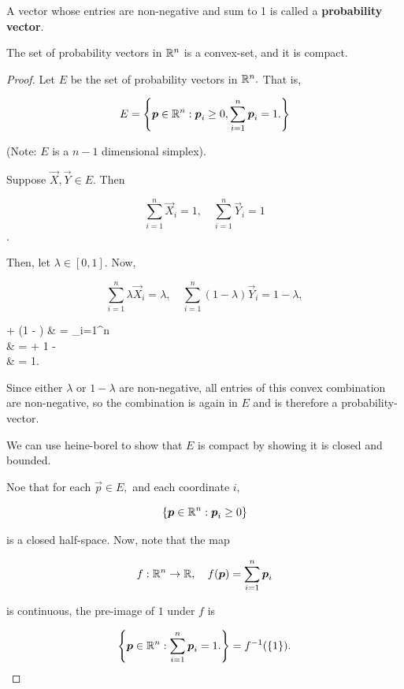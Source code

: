 \documentclass{article}
\begin{document}
\begin{definition}
	A \@{vector} whose \@{entries} are \@{non-negative} and sum to 1 is called a \textbf{probability vector}.
\end{definition}

\begin{theorem}\label{probability-vectors-form-a-convex-compact-set}
The set of \@{probability vectors} in $\mathbb{R}^n$ is a \@{convex-set}, and it is \@{compact}.


	\begin{proof}
		Let $E$ be the set of \@{probability vectors} in $\mathbb{R}^n.$ That is,

		\[ E = \left\{ \boldsymbol{p} \in \mathbb{R}^n : \boldsymbol{p}_i \geq 0, \sum_{i=1}^n \boldsymbol{p}_i = 1. \right\} \]

		(Note: $E$ is a $n-1$ dimensional \@{simplex}).

		Suppose $\vec{X}, \vec{Y} \in E.$ Then

		\[ \sum_{i=1}^n \vec{X}_i = 1, \quad \sum_{i=1}^n \vec{Y}_i = 1 \].

		Then, let $\lambda \in [0,1].$ Now,

		\[ \sum_{i=1}^n \lambda  \vec{X}_i = \lambda,  \quad \sum_{i=1}^n (1 - \lambda) \vec{Y}_i = 1 - \lambda, \]

		\bal
		\lambda {} + (1 - \lambda)  & = \sum_{i=1}^n  \\
		& = \lambda + 1 - \lambda \\
		& = 1.
		\eal

		Since either $\lambda$ or $1 - \lambda$ are non-negative, all entries of this \@{convex combination} are non-negative, so the
		combination is again in $E$ and is therefore a \@{probability-vector}.

		We can use \@{heine-borel} to show that $E$ is \@{compact} by showing it is \@{closed} and \@{bounded}.

		Noe that for each $\vec{p} \in E,$ and each \@{coordinate} $i,$

		\[ \left\{ \boldsymbol{p} \in \mathbb{R}^n : \boldsymbol{p}_i \geq 0 \right\} \]

		is a \@{closed} half-space. Now, note that the map

		\[ f : \mathbb{R}^n \to \mathbb{R}, \quad f(\boldsymbol{p}) = \sum_{i=1}^n \boldsymbol{p}_i \]

		is \@{continuous}, the \@{pre-image} of $1$ under $f$ is

		\[ \left\{ \boldsymbol{p} \in \mathbb{R}^n : \sum_{i=1}^n \boldsymbol{p}_i = 1. \right\} = f^{-1}(\left\{ 1 \right\}). \]


\end{proof}
\end{theorem}
\end{document}
